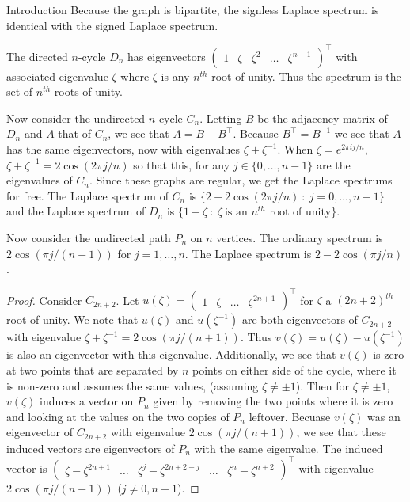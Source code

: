 \documentclass{article}
\begin{document}
\begin{section}{Introduction}
    Because the graph is bipartite, the signless Laplace spectrum is identical with the signed Laplace spectrum.

    The directed $n$-cycle $D_n$ has eigenvectors $\begin{pmatrix} 1 & \zeta & \zeta^2 & \hdots & \zeta^{n-1}\end{pmatrix}^\intercal$ with associated eigenvalue $\zeta$ where $\zeta$ is any $n^{th}$ root of unity.
    Thus the spectrum is the set of $n^{th}$ roots of unity.

    Now consider the undirected $n$-cycle $C_n$.
    Letting $B$ be the adjacency matrix of $D_n$ and $A$ that of $C_n$, we see that $A = B + B^\intercal$.
    Because $B^\intercal = B^{-1}$ we see that $A$ has the same eigenvectors, now with eigenvalues $\zeta + \zeta^{-1}$.
    When $\zeta = e^{2\pi i j/n}$, $\zeta + \zeta^{-1} = 2\cos(2\pi j /n)$ so that this, for any $j \in \{0,\ldots,n-1\}$ are the eigenvalues of $C_n$.
    Since these graphs are regular, we get the Laplace spectrums for free.
    The Laplace spectrum of $C_n$ is $\{2 - 2\cos(2\pi j/n)~:~j = 0,\ldots,n-1\}$ and the Laplace spectrum of $D_n$ is $\{1 - \zeta~:~\zeta~\text{is an $n^{th}$ root of unity}\}$.

    Now consider the undirected path $P_n$ on $n$ vertices.
    The ordinary spectrum is $2\cos(\pi j/(n+1))$ for $j = 1,\ldots,n$.
    The Laplace spectrum is $2 - 2\cos(\pi j/n)$.
    \begin{proof}
      Consider $C_{2n+2}$.
      Let $u(\zeta) = \begin{pmatrix} 1 & \zeta & \hdots & \zeta^{2n+1}\end{pmatrix}^\intercal$ for $\zeta$ a $(2n+2)^{th}$ root of unity.
      We note that $u(\zeta)$ and $u(\zeta^{-1})$ are both eigenvectors of $C_{2n+2}$ with eigenvalue $\zeta + \zeta^{-1} = 2\cos(\pi j/(n+1))$.
      Thus $v(\zeta) = u(\zeta) - u(\zeta^{-1})$ is also an eigenvector with this eigenvalue.
      Additionally, we see that $v(\zeta)$ is zero at two points that are separated by $n$ points on either side of the cycle, where it is non-zero and assumes the same values, (assuming $\zeta \neq \pm 1$).
     Then for $\zeta \neq \pm 1$, $v(\zeta)$ induces a vector on $P_n$ given by removing the two points where it is zero and looking at the values on the two copies of $P_n$ leftover.
     Becuase $v(\zeta)$ was an eigenvector of $C_{2n+2}$ with eigenvalue $2 \cos(\pi j/(n+1))$, we see that these induced vectors are eigenvectors of $P_n$ with the same eigenvalue.
      The induced vector is $\begin{pmatrix} \zeta - \zeta^{2n+1} & \hdots & \zeta^j - \zeta^{2n+2-j} & \hdots & \zeta^n - \zeta^{n+2} \end{pmatrix}^\intercal$ with eigenvalue $2\cos(\pi j/(n+1))$ ($j \neq 0, n+1$).
    \end{proof}


\end{section}
\end{document}
